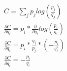 \documentclass[11pt,a4paper]{article}
\begin{document}
\begin{gather*}
C = \sum_j p_j log(\frac{p_j}{q_j}) \\
\frac{\partial C}{\partial q_i} = p_i * \frac{\partial}{\partial q_i} log(\frac{p_i}{q_i}) \\
\frac{\partial C}{\partial q_i} = p_i * \frac{q_j}{p_j} * (-\frac{p_i}{q_i^2}) \\
\frac{\partial C}{\partial q_i} = -\frac{p_i}{q_i} \\
\end{gather*}

\end{document}
